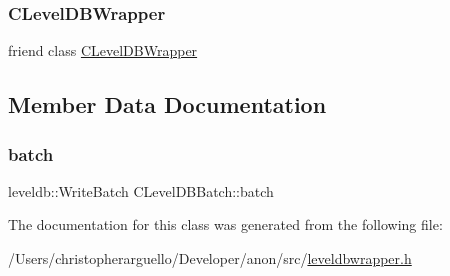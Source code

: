 \subsubsection{\texorpdfstring{C\+Level\+D\+B\+Wrapper}{CLevelDBWrapper}}
{\footnotesize\ttfamily friend class \mbox{\hyperlink{class_c_level_d_b_wrapper}{C\+Level\+D\+B\+Wrapper}}\hspace{0.3cm}{\ttfamily [friend]}}



\subsection{Member Data Documentation}
\mbox{\label{class_c_level_d_b_batch_af404cb1abfb4d62781eb6d22d408cd5d}} 
\subsubsection{\texorpdfstring{batch}{batch}}
{\footnotesize\ttfamily leveldb\+::\+Write\+Batch C\+Level\+D\+B\+Batch\+::batch\hspace{0.3cm}{\ttfamily [private]}}



The documentation for this class was generated from the following file\+:\begin{DoxyCompactItemize}
\item 
/\+Users/christopherarguello/\+Developer/anon/src/\mbox{\hyperlink{leveldbwrapper_8h}{leveldbwrapper.\+h}}\end{DoxyCompactItemize}
